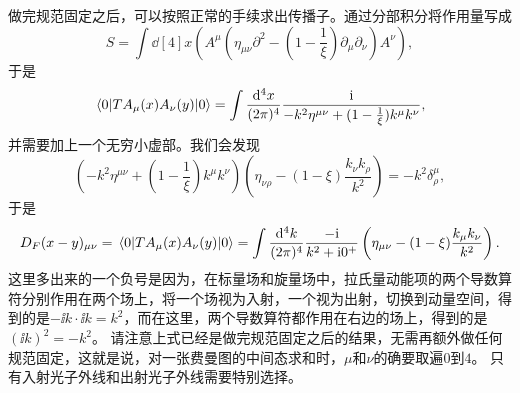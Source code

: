 做完规范固定之后，可以按照正常的手续求出传播子。通过分部积分将作用量写成
\[
    S = \int \dd[4]{x} (A^\mu (\eta_{\mu \nu} \partial^2 - (1 - \frac{1}{\xi}) \partial_\mu \partial_\nu) A^\nu),
\]
于是
\[
    \mel{0}{T A_\mu(x) A_\nu(y)}{0} = \int \frac{\dd[4]{x}}{(2\pi)^4} \frac{\mathrm{i}}{-k^2 \eta^{\mu \nu} + (1 - \frac{1}{\xi}) k^\mu k^\nu},
\]
并需要加上一个无穷小虚部。我们会发现
\[
    \left( -k^2 \eta^{\mu \nu} + (1 - \frac{1}{\xi}) k^\mu k^\nu \right) \left(\eta_{\nu \rho} - (1 - \xi) \frac{k_\nu k_\rho}{k^2} \right) = - k^2 \delta^\mu_\rho,
\]
于是
\begin{equation}
    D_F(x - y)_{\mu \nu} = \mel*{0}{T A_\mu(x) A_\nu(y)}{0} = \int \frac{\dd[4]{k}}{(2\pi)^4} \frac{-\mathrm{i}}{k^2 + \mathrm{i} 0^+} \left( \eta_{\mu \nu} - (1 - \xi) \frac{k_\mu k_\nu}{k^2} \right).
\end{equation}
这里多出来的一个负号是因为，在标量场和旋量场中，拉氏量动能项的两个导数算符分别作用在两个场上，将一个场视为入射，一个视为出射，切换到动量空间，得到的是$- \ii k \cdot \ii k = k^2$，而在这里，两个导数算符都作用在右边的场上，得到的是$(\ii k)^2=-k^2$。
请注意上式已经是做完规范固定之后的结果，无需再额外做任何规范固定，这就是说，对一张费曼图的中间态求和时，$\mu$和$\nu$的确要取遍$0$到$4$。
只有入射光子外线和出射光子外线需要特别选择。